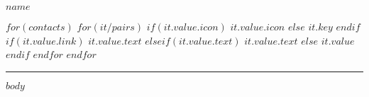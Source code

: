 \documentclass[10pt]{article}
\begin{document}
{%
\centering\huge{\textbf{\uppercase{$name$}}} \\
\hfill
}

\vspace{-1em}

\begin{center}
$for(contacts)$
  $for(it/pairs)$
    $if(it.value.icon)$
      \fa$it.value.icon$
    $else$
      \textbf{$it.key$}
    $endif$
    \hspace{0.3em}
    $if(it.value.link)$
      \href{$it.value.link$}{$it.value.text$}
    $elseif(it.value.text)$
      {$it.value.text$}
    $else$
      {$it.value$}
    $endif$ \>
  $endfor$
$endfor$
\end{center}

\vspace{-1em}

\textcolor{lightgray}{\rule{\textwidth}{0.05pt}}

\vspace{-.5em}

$body$
\end{document}
